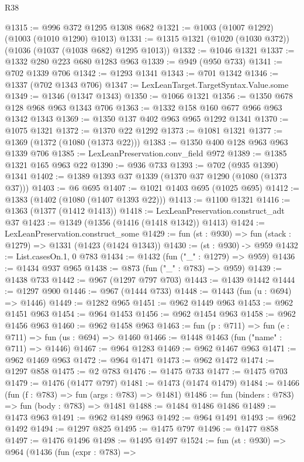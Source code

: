 \begin{lexlean}{R38}
\begin{coremodule}
@1315 := @996 @372 @1295 @1308 @682
@1321 := @1003 (@1007 @1292) (@1003 (@1010 @1290) @1013)
@1331 := @1315 @1321 (@1020 (@1030 @372)) (@1036 (@1037 (@1038 @682) @1295 @1013))
@1332 := @1046 @1321
@1337 := @1332 @280 @223 @680 @1283 @963
@1339 := @949 (@950 @733)
@1341 := @702 @1339 @706
@1342 := @1293 @1341
@1343 := @701 @1342
@1346 := @1337 (@702 @1343 @706)
@1347 := LexLeanTarget.TargetSyntax.Value.some
@1349 := @1346 (@1347 @1343)
@1350 := @1066 @1321
@1356 := @1350 @678 @128 @968 @963 @1343 @706
@1363 := @1332 @158 @160 @677 @966 @963 @1342 @1343
@1369 := @1350 @137 @402 @963 @965 @1292 @1341
@1370 := @1075 @1321
@1372 := @1370 @22 @1292
@1373 := @1081 @1321
@1377 := @1369 (@1372 (@1080 (@1373 @22)))
@1383 := @1350 @400 @128 @963 @963 @1339 @706
@1385 := LexLeanPreservation.conv_field @972
@1389 := @1385 @1321 @165 @963 @22
@1390 := @936 @733
@1393 := @702 (@935 @1390) @1341
@1402 := @1389 @1393 @37 @1339 (@1370 @37 @1290 (@1080 (@1373 @37)))
@1403 := @6 @695
@1407 := @1021 @1403 @695 (@1025 @695)
@1412 := @1383 (@1402 (@1080 (@1407 @1393 @22)))
@1413 := @1100 @1321
@1416 := @1363 (@1377 (@1412 @1413))
@1418 := LexLeanPreservation.construct_adt @37
@1423 := @1349 (@1356 (@1416 (@1418 @1342)) @1413)
@1424 := LexLeanPreservation.construct_some
@1429 := fun (st : @930) => fun (stack : @1279) => @1331 (@1423 (@1424 @1343))
@1430 := (st : @930) -> @959
@1432 := List.casesOn.{1, 0} @783
@1434 := @1432 (fun ("_" : @1279) => @959)
@1436 := @1434 @937 @965
@1438 := @873 (fun ("_" : @783) => @959)
@1439 := @1438 @733
@1442 := @967 (@1297 @797 @703)
@1443 := @1439 @1442
@1444 := @1297 @900
@1446 := @967 (@1444 @733)
@1448 := @1443 (fun (u : @694) => @1446)
@1449 := @1282 @965
@1451 := @962 @1449 @963
@1453 := @962 @1451 @963
@1454 := @964 @1453
@1456 := @962 @1454 @963
@1458 := @962 @1456 @963
@1460 := @962 @1458 @963
@1463 := fun (p : @711) => fun (e : @711) => fun (us : @694) => @1460
@1466 := @1448 @1463 (fun ("name" : @711) => @1446)
@1467 := @964 @1283
@1469 := @962 @1467 @963
@1471 := @962 @1469 @963
@1472 := @964 @1471
@1473 := @962 @1472
@1474 := @1297 @858
@1475 := @2 @783
@1476 := @1475 @733
@1477 := @1475 @703
@1479 := @1476 (@1477 @797)
@1481 := @1473 (@1474 @1479)
@1484 := @1466 (fun (f : @783) => fun (args : @783) => @1481)
@1486 := fun (binders : @783) => fun (body : @783) => @1481
@1488 := @1484 @1486 @1486
@1489 := @1473 @963
@1491 := @962 @1489 @963
@1492 := @964 @1491
@1493 := @962 @1492
@1494 := @1297 @825
@1495 := @1475 @797
@1496 := @1477 @858
@1497 := @1476 @1496
@1498 := @1495 @1497
@1524 := fun (st : @930) =>
  @964
    (@1436
      (fun (expr : @783) =>

\end{coremodule}
\end{lexlean}
